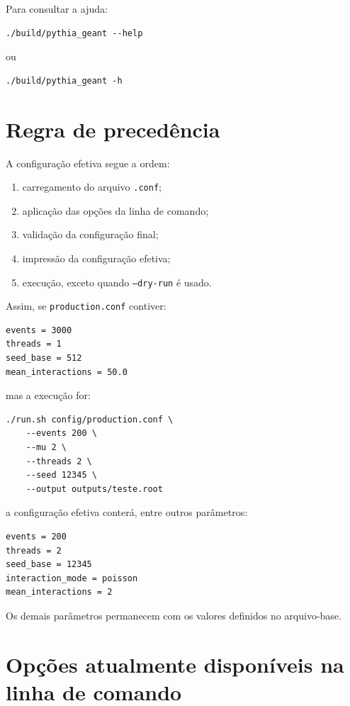 \documentclass[11pt,a4paper]{article}
\begin{document}
Para consultar a ajuda:

\begin{lstlisting}[style=shell]
./build/pythia_geant --help
\end{lstlisting}

ou

\begin{lstlisting}[style=shell]
./build/pythia_geant -h
\end{lstlisting}

\section{Regra de precedência}

A configuração efetiva segue a ordem:

\begin{enumerate}
  \item carregamento do arquivo \texttt{.conf};
  \item aplicação das opções da linha de comando;
  \item validação da configuração final;
  \item impressão da configuração efetiva;
  \item execução, exceto quando \texttt{--dry-run} é usado.
\end{enumerate}

Assim, se \texttt{production.conf} contiver:

\begin{lstlisting}[style=config]
events = 3000
threads = 1
seed_base = 512
mean_interactions = 50.0
\end{lstlisting}

mas a execução for:

\begin{lstlisting}[style=shell]
./run.sh config/production.conf \
    --events 200 \
    --mu 2 \
    --threads 2 \
    --seed 12345 \
    --output outputs/teste.root
\end{lstlisting}

a configuração efetiva conterá, entre outros parâmetros:

\begin{lstlisting}[style=config]
events = 200
threads = 2
seed_base = 12345
interaction_mode = poisson
mean_interactions = 2
\end{lstlisting}

Os demais parâmetros permanecem com os valores definidos no arquivo-base.

\section{Opções atualmente disponíveis na linha de comando}
\end{document}
